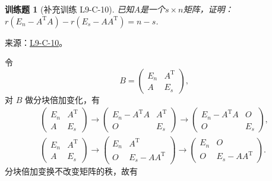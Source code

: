 \documentclass[UTF8,12pt,a4paper,fontset=fandol]{ctexart}
\newtheorem{exercise}{训练题}[section]
\begin{document}
\begin{exercise}[补充训练 L9-C-10]\label{prob:L9-C-10}
已知$A$是一个$s \times n$矩阵，证明：$r(E_n-A^\mathrm{T}A)-r(E_s-AA^\mathrm{T})=n-s$.
\end{exercise}
\noindent 来源：\href{https://github.com/yhwu-is/Linear-Algebra-Left-Undone/blob/new/%E8%AE%B2%E4%B9%89/%E4%B8%93%E9%A2%98/9%20%E7%9F%A9%E9%98%B5%E8%BF%90%E7%AE%97%E8%BF%9B%E9%98%B6.tex}{L9-C-10}。
\begin{solve}
令
            \[
                B = \begin{pmatrix}
                    E_n & A^\mathrm{T} \\
                    A   & E_s
                \end{pmatrix},
            \]
            对 $B$ 做分块倍加变化，有
            \begin{gather*}
                \begin{pmatrix}
                    E_n & A^\mathrm{T} \\
                    A   & E_s
                \end{pmatrix} \to \begin{pmatrix}
                    E_n - A^\mathrm{T}A & A^\mathrm{T} \\
                    O                   & E_s
                \end{pmatrix} \to \begin{pmatrix}
                    E_n - A^\mathrm{T}A & O   \\
                    O                   & E_s
                \end{pmatrix}, \\
                \begin{pmatrix}
                    E_n & A^\mathrm{T} \\
                    A   & E_s
                \end{pmatrix} \to \begin{pmatrix}
                    E_n & A^\mathrm{T}        \\
                    O   & E_s - AA^\mathrm{T}
                \end{pmatrix} \to \begin{pmatrix}
                    E_n & O                   \\
                    O   & E_s - AA^\mathrm{T}
                \end{pmatrix}.
            \end{gather*}
            分块倍加变换不改变矩阵的秩，故有

\end{solve}
\end{document}
